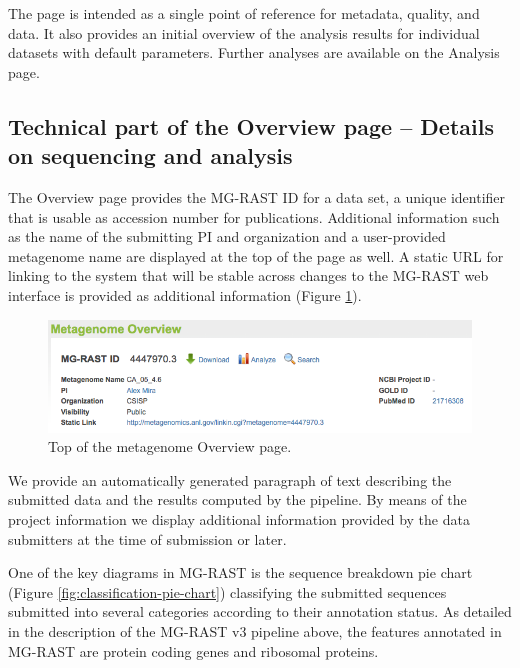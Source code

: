 \documentclass[12pt,fullpage]{report}
\begin{document}
The page is intended as a single point of reference for metadata, quality, and data. It also provides an initial overview of the analysis results for individual datasets with default parameters. Further analyses are available on the Analysis page.
\subsection{Technical part of the Overview page -- Details on sequencing and analysis}

The Overview page provides the MG-RAST ID for a data set, a unique identifier that is usable as accession number for publications. Additional information such as the name of the submitting PI and organization and a user-provided metagenome name are displayed at the top of the page as well. A static URL for linking to the system that will be stable across changes to the MG-RAST web interface is provided as additional information
(Figure \ref{fig:metagenome-overview}).

\begin{figure}
\begin{center}
\includegraphics[width=6in]{Images/metagenome-overview.png}
\end{center}
\caption{
Top of the metagenome Overview page.
}
\label{fig:metagenome-overview}
\end{figure}

We provide an automatically generated paragraph of text describing the submitted data and the results computed by the pipeline. By means of the project information we display additional information provided by the data submitters at the time of submission or later.

One of the key diagrams in MG-RAST is the sequence breakdown pie chart (Figure \ref{fig:classification-pie-chart}) classifying the submitted sequences submitted into several categories according to their annotation status. As detailed in the description of the MG-RAST v3 pipeline above, the features annotated in MG-RAST are protein coding genes and ribosomal proteins.
\end{document}
